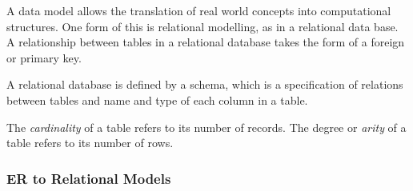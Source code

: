 \documentclass[12pt]{report}
\begin{document}
\begin{flushleft}
A data model allows the translation of real world concepts into computational
structures. One form of this is relational modelling, as in a relational data
base. A relationship between tables in a relational database takes the form of
a foreign or primary key. \par
A relational database is defined by a schema, which is a specification of
relations between tables and name and type of each column in a table. \par
The \textit{cardinality} of a table refers to its number of records. The degree
or \textit{arity} of a table refers to its number of rows.

\subsubsection*{ER to Relational Models}


\end{flushleft}
\end{document}
